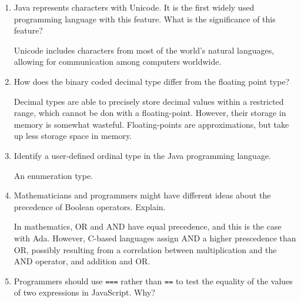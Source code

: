 \begin{enumerate}
\begin{answer}
    \end{answer}

  \item Java represents characters with Unicode. It is the first
    widely used programming language with this feature. What is the
    significance of this feature?

  \begin{answer}

   Unicode includes characters from most of the world's natural languages, allowing for communication among computers worldwide.

    \end{answer}

  \item How does the binary coded decimal type differ from the
    floating point type?

  \begin{answer}

    Decimal types are able to precisely store decimal values within a restricted range, which cannot be don with a floating-point. However, their storage in memory is somewhat wasteful. Floating-points are approximations, but take up less storage space in memory.

    \end{answer}

  \item Identify a user-defined ordinal type in the Java programming
    language.

  \begin{answer}

    An enumeration type.

    \end{answer}

  \item Mathematicians and programmers might have different ideas
    about the precedence of Boolean operators. Explain.

  \begin{answer}

    In mathematics, OR and AND have equal precedence, and this is the case with Ada. However, C-based languages assign AND a higher prescedence than OR, possibly resulting from a correlation between multiplication and the AND operator, and addition and OR.

    \end{answer}

  \item Programmers should use \verb+===+ rather than \verb+==+ to
    test the equality of the values of two expressions in JavaScript. Why?


\end{enumerate}
